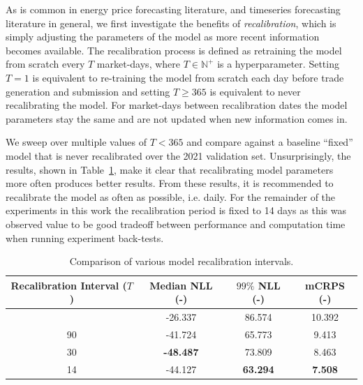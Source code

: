 As is common in energy price forecasting literature, and timeseries forecasting literature in general, we first
investigate the benefits of \textit{recalibration}, which is simply adjusting the parameters of the model as more
recent information becomes available.
The recalibration process is defined as retraining the model from scratch every $T$ market-days, where
$T \in \mathbb{N}^+$ is a hyperparameter.
Setting $T=1$ is equivalent to re-training the model from scratch each day before trade generation and submission and
setting $T \geq 365$ is equivalent to never recalibrating the model.
For market-days between recalibration dates the model parameters stay the same and are not updated when new information
comes in.

We sweep over multiple values of $T < 365$ and compare against a baseline ``fixed'' model that is never recalibrated
over the 2021 validation set.
Unsurprisingly, the results, shown in Table~\ref{tab:recalibration}, make it clear that recalibrating model parameters
more often produces better results.
From these results, it is recommended to recalibrate the model as often as possible, i.e. daily.
For the remainder of the experiments in this work the recalibration period is fixed to 14 days as this was observed
value to be good tradeoff between performance and computation time when running experiment back-tests.

\begin{table}[htb]
    \caption[Results of parameter recalibration]{
        Comparison of various model recalibration intervals.
    }
    \begin{center}
        \begin{tabular}{||c|c|c|c||} \hline
        Recalibration Interval ($T$) & Median NLL (-)  & $99\%$ NLL (-) & mCRPS (-)  \\	%
        \hline \hline
        \geq 365  &         -26.337  &         86.574  &        10.392  \\ \hline
        90        &         -41.724  &         65.773  &         9.413  \\ \hline
        30        & \textbf{-48.487} &         73.809  &         8.463  \\ \hline
        14        &         -44.127  & \textbf{63.294} & \textbf{7.508} \\ \hline
        \end{tabular}
        \\ \rule{0mm}{5mm}
    \end{center}
    \label{tab:recalibration}
\end{table}

